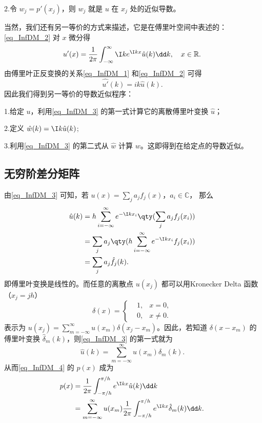 2.令 $w_j=p'(x_j)$，则 $w_j$ 就是 $u$ 在 $x_j$ 处的近似导数。

当然，我们还有另一等价的方式来描述，它是在傅里叶空间中表述的：\autoref{eq_InfDM_2}  对 $x$ 微分得
\begin{equation}
u'(x)=\frac{1}{2\pi}\int_{-\infty}^{\infty} \I ke^{\I kx}\hat u(k)\dd k,\quad x\in \mathbb R.~
\end{equation}
由傅里叶正反变换的关系\autoref{eq_InfDM_1} 和\autoref{eq_InfDM_2} 可得
\begin{equation}
\hat{u'}(k)=ik\hat u(k).~
\end{equation}
因此我们得到另一等价的导数近似程序：

1.给定 $u$，利用\autoref{eq_InfDM_3} 的第一式计算它的离散傅里叶变换 $\hat u$；

2.定义 $\hat w(k)=\I k\hat u(k)$;

3.利用\autoref{eq_InfDM_3} 的第二式从 $\hat w$ 计算 $w$。这即得到在给定点的导数近似。

\subsection{无穷阶差分矩阵}
由\autoref{eq_InfDM_3}  可知，若 $u(x)=\sum\limits_{j}a_jf_j(x)$，$a_i\in\mathbb C$， 那么
\begin{equation}
\begin{aligned}
\hat u(k)&=h\sum_{i=-\infty}^{\infty}e^{-\I kx_i}\qty(\sum\limits_{j}a_jf_j(x_i))\\
&=\sum\limits_{j}a_j\qty(h\sum_{i=-\infty}^{\infty}e^{-\I kx_i}f_j(x_i))\\
&=\sum_{j}a_j\hat f_j(k).
\end{aligned}~
\end{equation}
即傅里叶变换是线性的。而任意的离散点 $u(x_j)$ 都可以用Kronecker Delta 函数（$x_j=jh$） 
\begin{equation}
\delta(x)=\left\{\begin{aligned}
&1,&x=0,\\
&0,&x\neq0.
\end{aligned}\right.~
\end{equation}
表示为 $u(x_j)=\sum\limits_{m=-\infty}^{\infty}u(x_m)\delta(x_j-x_m)$。因此，若知道 $\delta(x-x_m)$ 的傅里叶变换 $\hat\delta_m(k)$，则\autoref{eq_InfDM_3} 的第一式就为 
\begin{equation}
\hat u(k)=\sum\limits_{m=-\infty}^\infty u(x_m)\hat\delta_m(k).~
\end{equation}
从而\autoref{eq_InfDM_4} 的 $p(x)$ 成为
\begin{equation}
\begin{aligned}
p(x)&=\frac{1}{2\pi}\int_{-\pi/h}^{\pi/h} e^{\I kx}\hat u(k)\dd k\\
&=\sum\limits_{m=-\infty}^\infty u(x_m)\frac{1}{2\pi}\int_{-\pi/h}^{\pi/h} e^{\I kx}\hat\delta_m(k)\dd k.
\end{aligned}~
\end{equation}

